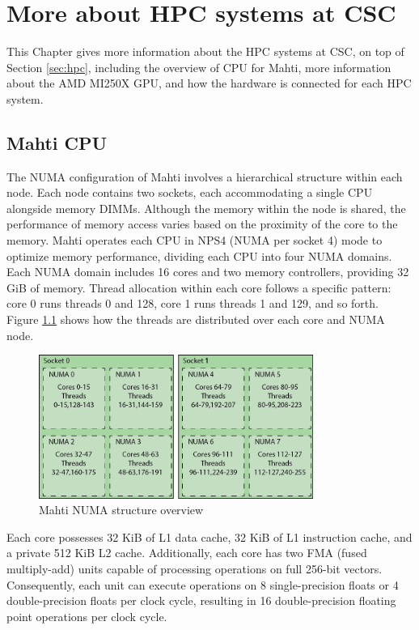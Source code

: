 \chapter{More about HPC systems at CSC}
This Chapter gives more information about the HPC systems at CSC, on top of Section \ref{sec:hpc}, including the overview of CPU for Mahti, more information about the AMD MI250X GPU, and how the hardware is connected for each HPC system.

\section{Mahti CPU}
The NUMA configuration of Mahti \cite{mahti} involves a hierarchical structure within each node. Each node contains two sockets, each accommodating a single CPU alongside memory DIMMs. Although the memory within the node is shared, the performance of memory access varies based on the proximity of the core to the memory. Mahti operates each CPU in NPS4 (NUMA per socket 4) mode to optimize memory performance, dividing each CPU into four NUMA domains. Each NUMA domain includes 16 cores and two memory controllers, providing 32 GiB of memory. Thread allocation within each core follows a specific pattern: core 0 runs threads 0 and 128, core 1 runs threads 1 and 129, and so forth. Figure \ref{fig_mahti_numa} shows how the threads are distributed over each core and NUMA node.

\begin{figure}[H]
    \centering
    \includegraphics[width=0.8\textwidth]{figures/mahti_numa.png}
    \caption{Mahti NUMA structure overview \cite{mahti}}
    \label{fig_mahti_numa}
\end{figure}

Each core possesses 32 KiB of L1 data cache, 32 KiB of L1 instruction cache, and a private 512 KiB L2 cache. Additionally, each core has two FMA (fused multiply-add) units capable of processing operations on full 256-bit vectors. Consequently, each unit can execute operations on 8 single-precision floats or 4 double-precision floats per clock cycle, resulting in 16 double-precision floating point operations per clock cycle.

